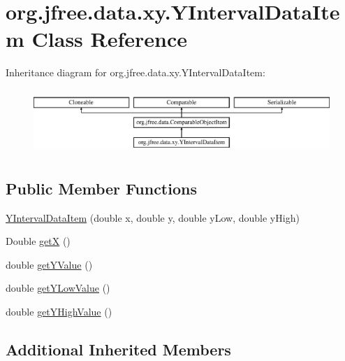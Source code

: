 \hypertarget{classorg_1_1jfree_1_1data_1_1xy_1_1_y_interval_data_item}{}\section{org.\+jfree.\+data.\+xy.\+Y\+Interval\+Data\+Item Class Reference}
\label{classorg_1_1jfree_1_1data_1_1xy_1_1_y_interval_data_item}
Inheritance diagram for org.\+jfree.\+data.\+xy.\+Y\+Interval\+Data\+Item\+:\begin{figure}[H]
\begin{center}
\leavevmode
\includegraphics[height=2.456140cm]{classorg_1_1jfree_1_1data_1_1xy_1_1_y_interval_data_item}
\end{center}
\end{figure}
\subsection*{Public Member Functions}
\begin{DoxyCompactItemize}
\item 
\mbox{\hyperlink{classorg_1_1jfree_1_1data_1_1xy_1_1_y_interval_data_item_a10a1e3551570c839f7ce27e152e7abf8}{Y\+Interval\+Data\+Item}} (double x, double y, double y\+Low, double y\+High)
\item 
Double \mbox{\hyperlink{classorg_1_1jfree_1_1data_1_1xy_1_1_y_interval_data_item_ae85fcb436f6fd82b56facb299b9305c8}{getX}} ()
\item 
double \mbox{\hyperlink{classorg_1_1jfree_1_1data_1_1xy_1_1_y_interval_data_item_ae16eeb27b834abd3cf0e11abc4f3deee}{get\+Y\+Value}} ()
\item 
double \mbox{\hyperlink{classorg_1_1jfree_1_1data_1_1xy_1_1_y_interval_data_item_a57fe19acaa7d9fde1a92b94f76114edf}{get\+Y\+Low\+Value}} ()
\item 
double \mbox{\hyperlink{classorg_1_1jfree_1_1data_1_1xy_1_1_y_interval_data_item_a55c875cc17bc25e0b52302ea7ef7cc79}{get\+Y\+High\+Value}} ()
\end{DoxyCompactItemize}
\subsection*{Additional Inherited Members}


